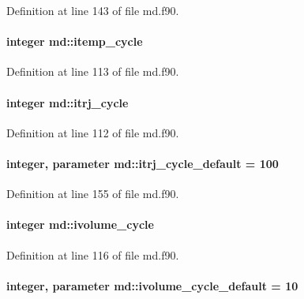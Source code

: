 Definition at line 143 of file md.\-f90.

\hypertarget{classmd_afcf5d82cba5392d79192e160903a14d1}{
\paragraph[{itemp\-\_\-cycle}]{\setlength{\rightskip}{0pt plus 5cm}integer md\-::itemp\-\_\-cycle}}\label{classmd_afcf5d82cba5392d79192e160903a14d1}


Definition at line 113 of file md.\-f90.

\hypertarget{classmd_aafacc3d975864e8cf80ada72a98674f4}{
\paragraph[{itrj\-\_\-cycle}]{\setlength{\rightskip}{0pt plus 5cm}integer md\-::itrj\-\_\-cycle}}\label{classmd_aafacc3d975864e8cf80ada72a98674f4}


Definition at line 112 of file md.\-f90.

\hypertarget{classmd_a1bb5d4a2cb75b8acccea5794f0a58aa6}{
\paragraph[{itrj\-\_\-cycle\-\_\-default}]{\setlength{\rightskip}{0pt plus 5cm}integer, parameter md\-::itrj\-\_\-cycle\-\_\-default = 100}}\label{classmd_a1bb5d4a2cb75b8acccea5794f0a58aa6}


Definition at line 155 of file md.\-f90.

\hypertarget{classmd_a49114a8929e898075ccda1f194d25272}{
\paragraph[{ivolume\-\_\-cycle}]{\setlength{\rightskip}{0pt plus 5cm}integer md\-::ivolume\-\_\-cycle}}\label{classmd_a49114a8929e898075ccda1f194d25272}


Definition at line 116 of file md.\-f90.

\hypertarget{classmd_a42c0f9c0e9bdf6141851cf83dc1ae2f1}{
\paragraph[{ivolume\-\_\-cycle\-\_\-default}]{\setlength{\rightskip}{0pt plus 5cm}integer, parameter md\-::ivolume\-\_\-cycle\-\_\-default = 10}}\label{classmd_a42c0f9c0e9bdf6141851cf83dc1ae2f1}


